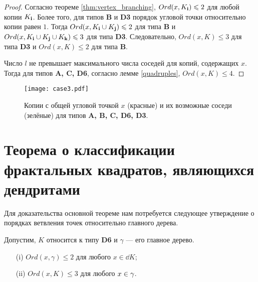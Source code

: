 \begin{proof}
Согласно теореме \ref{thm:vertex_branching}, $Ord(x,K_{\bf{i}})\leqslant2$ для любой копии $K_{\bf{i}}$.
Более того, для типов \textbf{B} и \textbf{D3} порядок угловой точки относительно копии равен $1$.
Тогда $Ord(x,K_{\bf{i}}\cup K_{\bf{j}})\leqslant2$ для типа \textbf{B} и $Ord(x,K_{\bf{i}}\cup K_{\bf{j}}\cup K_{\bf{k}})\leqslant3$ для типа \textbf{D3}.
Следовательно, $Ord(x,K)\leq3$ для типа {\bf D3} и $Ord(x,K)\leq2$ для типа {\bf B}.

Число $l$ не превышает максимального числа соседей для копий, содержащих $x$.
Тогда для типов {\bf A, C, D6}, согласно лемме \ref{quadruples}, $Ord(x,K)\leq4$.
\end{proof}

\begin{figure}[H]
\centering
\texttt{[image: case3.pdf]}
\caption{Копии с общей угловой точкой $x$ (красные) и их возможные соседи (зелёные) для типов {\bf A, B, C, D6, D3}.}
\label{fig:case3}
\end{figure}


\section{Теорема о классификации фрактальных квадратов, являющихся дендритами}

Для доказательства основной теореме нам потребуется следующее утверждение о порядках ветвления точек относительно главного дерева.

\begin{proposition}\label{lem:d4bound}
Допустим, $K$ относится к типу {\bf D6} и $\gamma$ --- его главное дерево.
\begin{itemize}[nolistsep]
    \item[(i)] $Ord(x,\gamma)\leq2$ для любого $x\in\dd K$;
    \item[(ii)] $Ord(x,K)\leq3$ для любого $x\in\gamma$.
\end{itemize}
\end{proposition}



